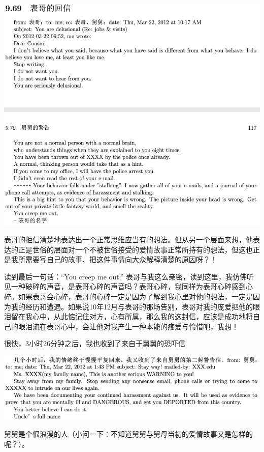 \documentclass[9pt, b5paper]{article}
\begin{document}
\begin{center}
\includegraphics[width=.9\linewidth]{./pic/p1p117.png}
\end{center}

表哥的拒信清楚地表达出一个正常思维应当有的想法。但从另一个层面来想，他表达的正是世俗的层面对一个不被世俗接受的爱情故事正常所持有的想法，但这也正是我所需要写自己的故事、把这件事情向大众解释清楚的原因呀？！

读到最后一句话：“You creep me out.” 表哥与我这么亲密，读到这里，我仿佛听见一种破碎的声音，是表哥心碎的声音吗？表哥心碎，我同样为表哥心碎感到心碎。如果表哥会心碎，表哥的心碎一定是因为了解到我心里对他的想法，一定是因为我的经历和遭遇。如果说10年12月与表哥的那场告别，表哥对我的庞爱把他的眼泪留在我心中，从此惦记住对方，心有所属，那么我的这封信，应该是成功地将自己的眼泪流在表哥心中，会让他对我产生一种本能的疼爱与怜惜吧，我想！

很快，3小时26分钟之后，我也收到了来自于舅舅的恐吓信

\begin{center}
\includegraphics[width=.9\linewidth]{./pic/p1p117-2.png}
\end{center}

舅舅是个很浪漫的人（小问一下：不知道舅舅与舅母当初的爱情故事又是怎样的呢？）。 
\end{document}
